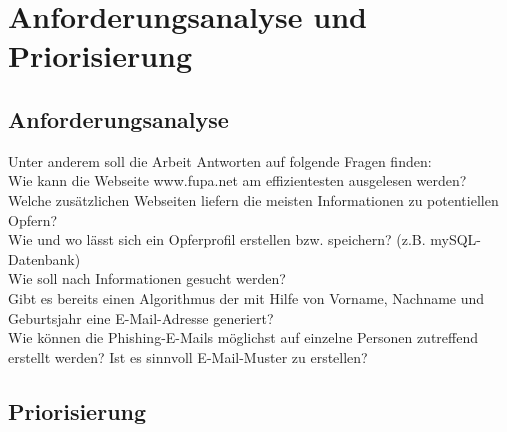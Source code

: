 
\chapter{Anforderungsanalyse und Priorisierung}  %
\label{cha:} %
\section{Anforderungsanalyse} %
\label{sec:} %

Unter anderem soll die Arbeit Antworten auf folgende Fragen finden:\\
Wie kann die Webseite www.fupa.net am effizientesten ausgelesen werden?\\
Welche zusätzlichen Webseiten liefern die meisten Informationen zu potentiellen Opfern?\\
Wie und wo lässt sich ein Opferprofil erstellen bzw. speichern? (z.B. mySQL-Datenbank)\\
Wie soll nach Informationen gesucht werden?\\
Gibt es bereits einen Algorithmus der mit Hilfe von Vorname, Nachname und Geburtsjahr eine E-Mail-Adresse generiert?\\
Wie können die Phishing-E-Mails möglichst auf einzelne Personen zutreffend erstellt werden? Ist es sinnvoll E-Mail-Muster zu erstellen?\\

\subsection{} %
\label{sse:}
\subsubsection{} %
\label{sss:}
\section{Priorisierung} %
\label{sec:} %
